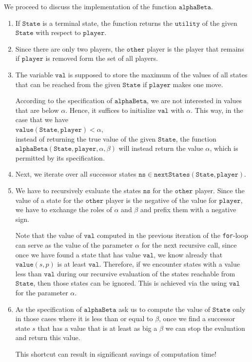 We proceed to discuss the implementation of the function $\texttt{alphaBeta}$.
\begin{enumerate}
\item If $\texttt{State}$ is a terminal state, the function returns the $\texttt{utility}$ of the given
      $\texttt{State}$ with respect to $\texttt{player}$.
\item Since there are only two players, the $\texttt{other}$ player is the player 
      that remains if $\texttt{player}$ is removed form the set of all players.
\item The variable $\texttt{val}$ is supposed to store the maximum of the values of all states
      that can be reached from the given $\texttt{State}$ if $\texttt{player}$ makes one move.
      
      According to the specification of $\texttt{alphaBeta}$,  we are not interested in values that are below
      $\alpha$.  Hence, it suffices to initialize $\texttt{val}$ with $\alpha$.   This way, in the case that we have
      \\[0.2cm]
      \hspace*{1.3cm}
      $\texttt{value}(\texttt{State},\texttt{player}) < \alpha$,
      \\[0.2cm]
      instead of returning the true value of the given $\texttt{State}$, the function
      $\texttt{alphaBeta}(\texttt{State},\texttt{player},\alpha,\beta)$ will instead return the value $\alpha$, which is permitted by its specification.
\item Next, we iterate over all successor states $\texttt{ns} \in \texttt{nextStates}(\texttt{State}, \texttt{player})$.
\item We have to recursively evaluate the states $\texttt{ns}$ for the $\texttt{other}$ player.
      Since the value of a state for the $\texttt{other}$ player is the negative of the value for
      $\texttt{player}$, we have to exchange the roles of $\alpha$ and $\beta$ and prefix them with a negative
      sign.

      Note that the value of $\texttt{val}$ computed in the previous iteration of the \texttt{for}-loop 
      can serve as the value of the parameter $\alpha$ for the next recursive call, since once we have found a 
      state that has value $\texttt{val}$, we know already that $\texttt{value}(s,p)$ is at least
      $\texttt{val}$.  Therefore,  if we encounter states with a value
      less than $\texttt{val}$ during our recursive evaluation of the states reachable from $\texttt{State}$,
      then those states can be ignored.   This is achieved via the using $\texttt{val}$ for the parameter $\alpha$.
\item As the specification of $\texttt{alphaBeta}$ ask us to compute the value of $\texttt{State}$ only in
      those cases where it is less than or equal to $\beta$, once we find a successor state $s$ that has a
      value that is at least as big a $\beta$ we can stop the evaluation and return this value.

      {\color{red}This shortcut can result in significant savings of computation time!}
\end{enumerate}

